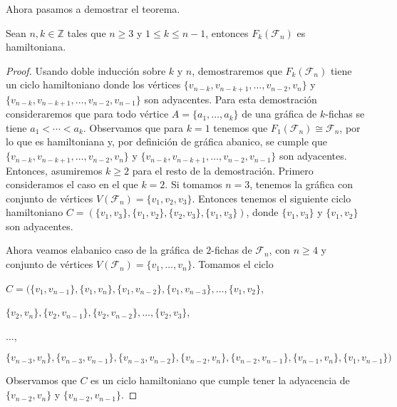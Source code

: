 Ahora pasamos a demostrar el teorema.
    
\begin{teorema}
\label{teo:hamilt-SFan}
    Sean $n,k \in \mathbb{Z}$ tales que $n \geq 3$ y $1 \leq k \leq n-1$,
    entonces $F_k(\mathcal{F}_n)$ es hamiltoniana.
\end{teorema}
    
\begin{proof}
    Usando doble inducci\'on sobre $k$ y $n$, demostraremos que
    $F_k(\mathcal{F}_n)$ tiene un ciclo hamiltoniano donde los v\'ertices
    $\{v_{n-k}, v_{n-k+1}, \dots, v_{n-2}, v_n\}$ y $\{v_{n-k}, v_{n-k+1},
    \dots, v_{n-2}, v_{n-1}\}$ son adyacentes. Para esta demostraci\'on
    consideraremos que para todo v\'ertice $A = \{a_1, \dots, a_k\}$ de una
    gr\'afica de $k$-fichas se tiene $a_1 < \cdots < a_k$. Observamos que para
    $k =1$ tenemos que $F_1(\mathcal{F}_n) \cong \mathcal{F}_n$, por lo que es
    hamiltoniana y, por definici\'on de gr\'afica abanico, se cumple que
    $\{v_{n-k}, v_{n-k+1}, \dots, v_{n-2}, v_n\}$ y $\{v_{n-k}, v_{n-k+1},
    \dots, v_{n-2}, v_{n-1}\}$ son adyacentes. Entonces, asumiremos $k \geq 2$
    para el resto de la demostraci\'on. Primero consideramos el caso en el que
    $k =2$. Si tomamos $n = 3$, tenemos la gr\'afica con conjunto de v\'ertices
    $V(\mathcal{F}_n)=\{v_1, v_2, v_3\}$. Entonces tenemos el siguiente ciclo
    hamiltoniano $C= (\{v_1,v_3\},\{v_1,v_2\},\{v_2,v_3\}, \{v_1,v_3\})$, donde
    $\{v_1, v_3\}$ y $\{v_1, v_2\}$ son adyacentes. 
            
    Ahora veamos elabanico caso de la gr\'afica de $2$-fichas de
    $\mathcal{F}_n$, con $n \geq 4$ y conjunto de v\'ertices
    $V(\mathcal{F}_n)=\{v_1,\dots, v_n\}$. Tomamos el ciclo
    
    $C = (\{v_1, v_{n-1}\},\{v_1, v_n\},\{v_1, v_{n-2}\}, \{v_1, v_{n-3}\},
    \dots, \{v_1, v_2\}$,
            
    $\{v_2, v_n\}, \{v_2, v_{n-1}\}, \{v_2, v_{n-2}\}, \dots, \{v_2,v_3\}$,
    
    $ \dots$,
    
    $\{v_{n-3},v_n\}, \{v_{n-3}, v_{n-1}\},\{v_{n-3},v_{n-2}\}, \{v_{n-2},
    v_n\},\{v_{n-2}, v_{n-1}\}, \{v_{n-1}, v_n\}, \{v_1, v_{n-1}\})$
    
    Observamos que $C$ es un ciclo hamiltoniano que cumple tener la adyacencia
    de  $\{v_{n-2}, v_n\}$ y $\{v_{n-2}, v_{n-1}\}$. 
    

\end{proof}

